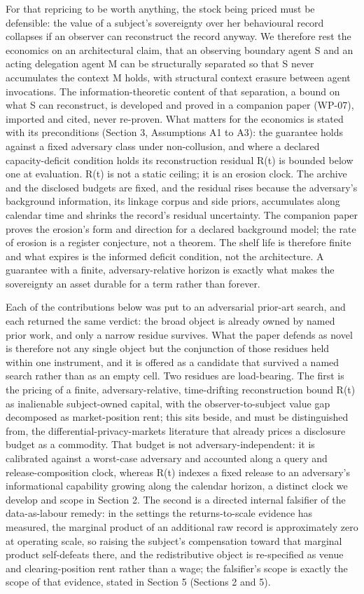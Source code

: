 \documentclass[
  11pt,
]{article}
\begin{document}
For that repricing to be worth anything, the stock being priced must be
defensible: the value of a subject's sovereignty over her behavioural
record collapses if an observer can reconstruct the record anyway. We
therefore rest the economics on an architectural claim, that an
observing boundary agent S and an acting delegation agent M can be
structurally separated so that S never accumulates the context M holds,
with structural context erasure between agent invocations. The
information-theoretic content of that separation, a bound on what S can
reconstruct, is developed and proved in a companion paper (WP-07),
imported and cited, never re-proven. What matters for the economics is
stated with its preconditions (Section 3, Assumptions A1 to A3): the
guarantee holds against a fixed adversary class under non-collusion, and
where a declared capacity-deficit condition holds its reconstruction
residual R(t) is bounded below one at evaluation. R(t) is not a static
ceiling; it is an erosion clock. The archive and the disclosed budgets
are fixed, and the residual rises because the adversary's background
information, its linkage corpus and side priors, accumulates along
calendar time and shrinks the record's residual uncertainty. The
companion paper proves the erosion's form and direction for a declared
background model; the rate of erosion is a register conjecture, not a
theorem. The shelf life is therefore finite and what expires is the
informed deficit condition, not the architecture. A guarantee with a
finite, adversary-relative horizon is exactly what makes the sovereignty
an asset durable for a term rather than forever.

Each of the contributions below was put to an adversarial prior-art
search, and each returned the same verdict: the broad object is already
owned by named prior work, and only a narrow residue survives. What the
paper defends as novel is therefore not any single object but the
conjunction of those residues held within one instrument, and it is
offered as a candidate that survived a named search rather than as an
empty cell. Two residues are load-bearing. The first is the pricing of a
finite, adversary-relative, time-drifting reconstruction bound R(t) as
inalienable subject-owned capital, with the observer-to-subject value
gap decomposed as market-position rent; this sits beside, and must be
distinguished from, the differential-privacy-markets literature that
already prices a disclosure budget as a commodity. That budget is not
adversary-independent: it is calibrated against a worst-case adversary
and accounted along a query and release-composition clock, whereas R(t)
indexes a fixed release to an adversary's informational capability
growing along the calendar horizon, a distinct clock we develop and
scope in Section 2. The second is a directed internal falsifier of the
data-as-labour remedy: in the settings the returns-to-scale evidence has
measured, the marginal product of an additional raw record is
approximately zero at operating scale, so raising the subject's
compensation toward that marginal product self-defeats there, and the
redistributive object is re-specified as venue and clearing-position
rent rather than a wage; the falsifier's scope is exactly the scope of
that evidence, stated in Section 5 (Sections 2 and 5).
\end{document}
